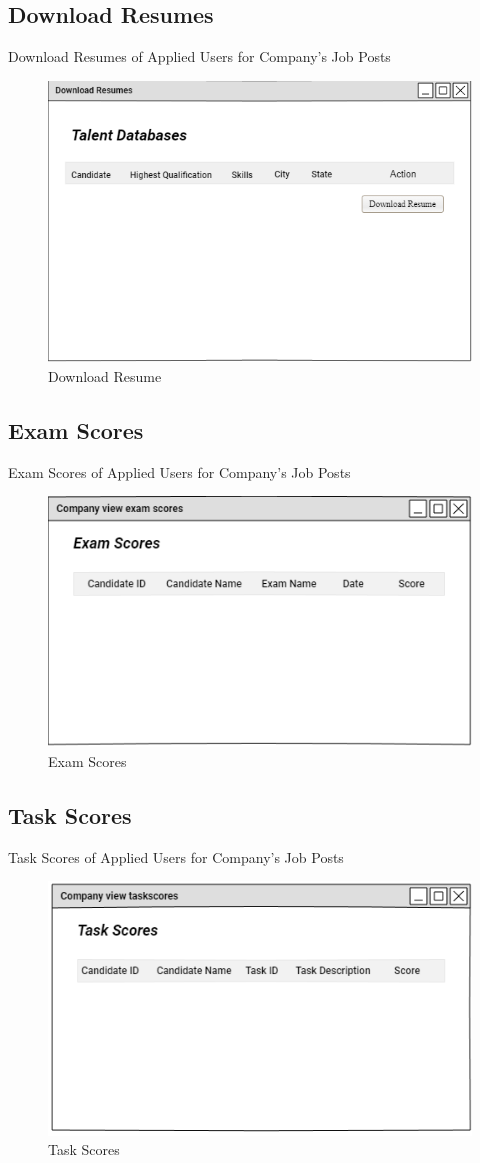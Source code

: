 \documentclass[a4paper,12pt]{report}
\begin{document}
\subsection {Download Resumes}
Download Resumes of Applied Users for Company's Job Posts
\begin{figure}[bph]
	\centering
	\includegraphics[width=.7\linewidth]{img/company/dwnldresm}
	\caption{Download Resume}
\end{figure}

\subsection {Exam Scores}
Exam Scores of Applied Users for Company's Job Posts
\begin{figure}[bph]
	\centering
	\includegraphics[width=.6\linewidth]{img/company/cmpnyviewexmscr}
	\caption{Exam Scores}
\end{figure}
\pagebreak
\subsection {Task Scores}
Task Scores of Applied Users for Company's Job Posts
\begin{figure}[bph]
	\centering
	\includegraphics[width=.7\linewidth]{img/company/cmpnytaskviewscr}
	\caption{Task Scores}
\end{figure}
\end{document}
